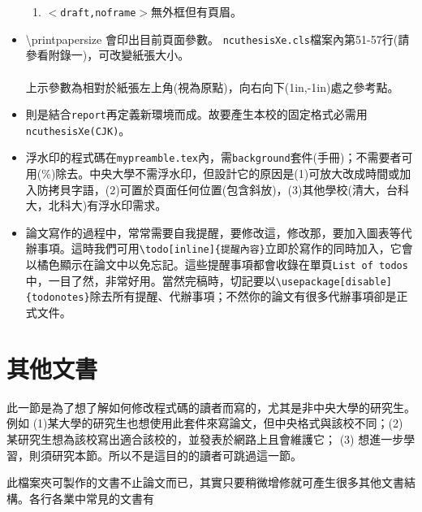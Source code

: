 \begin{itemize}
\begin{enumerate}
\item$<${\tt draft,noframe}$>$無外框但有頁眉。
\end{enumerate}
\item \textbackslash printpapersize 會印出目前頁面參數。
{\tt ncuthesisXe.cls}檔案內第51-57行(請參看附錄一)，可改變紙張大小。\\
\framebox{
\printpagesize 
}\\               %
上示參數為相對於紙張左上角(視為原點)，向右向下(1in,-1in)處之參考點。
\item {}\hfil{}則是結合{\tt report}再定義新環境而成。故要產生本校的固定格式必需用{\tt ncuthesisXe(CJK)}。
\item 浮水印的程式碼在{\tt mypreamble.tex}內，需{\tt background}套件(手冊)；不需要者可用(\%)除去。中央大學不需浮水印，但設計它的原因是(1)可放大改成時間或加入防拷貝字語，(2)可置於頁面任何位置(包含斜放)，(3)其他學校(清大，台科大，北科大)有浮水印需求。
\item 論文寫作的過程中，常常需要自我提醒，要修改這，修改那，要加入圖表等代辦事項。這時我們可用\verb|\todo[inline]{提醒內容}|立即於寫作的同時加入，它會以橘色顯示在論文中以免忘記。這些提醒事項都會收錄在單頁{\tt List of todos}中，一目了然，非常好用。當然完稿時，切記要以{\tt \textbackslash usepackage[disable]\{todonotes\}}除去所有提醒、代辦事項；不然你的論文有很多代辦事項卻是正式文件。
\end{itemize}

\section{其他文書\label{others}}

此一節是為了想了解如何修改程式碼的讀者而寫的，尤其是非中央大學的研究生。例如 (1)某大學的研究生也想使用此套件來寫論文，但中央格式與該校不同；(2) 某研究生想為該校寫出適合該校的，並發表於網路上且會維護它； (3) 想進一步學習，則須研究本節。所以不是這目的的讀者可跳過這一節。

此檔案夾可製作的文書不止論文而已，其實只要稍微增修就可產生很多其他文書結構。各行各業中常見的文書有

